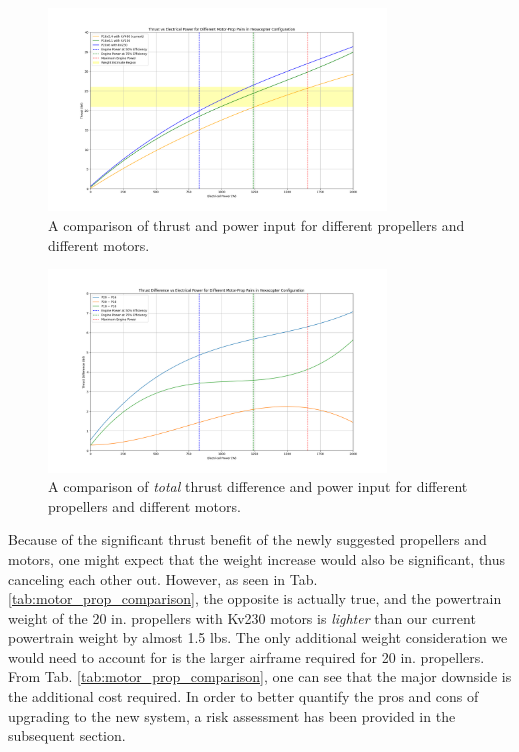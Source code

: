 \documentclass{article}
\begin{document}
\begin{figure}[htbp]
    \centering
    \includegraphics[width=0.8\textwidth]{Prop Comparison (experimental).png}
    \caption{A comparison of thrust and power input for different propellers and different motors.}
    \label{fig:prop_comparison_experimental}
\end{figure}
\begin{figure}[htbp]
    \centering
    \includegraphics[width=0.8\textwidth]{Prop Difference Comparison (experimental).png}
    \caption{A comparison of \textit{total} thrust difference and power input for different propellers and different motors.}
    \label{fig:prop_difference_comparison_experimental}
\end{figure}

Because of the significant thrust benefit of the newly suggested propellers and motors, one might expect that the weight increase would also be significant, thus canceling each other out. However, as seen in Tab. \ref{tab:motor_prop_comparison}, the opposite is actually true, and the powertrain weight of the 20 in. propellers with Kv230 motors is \textit{lighter} than our current powertrain weight by almost 1.5 lbs. The only additional weight consideration we would need to account for is the larger airframe required for 20 in. propellers. From Tab. \ref{tab:motor_prop_comparison}, one can see that the major downside is the additional cost required. In order to better quantify the pros and cons of upgrading to the new system, a risk assessment has been provided in the subsequent section. 
\end{document}
